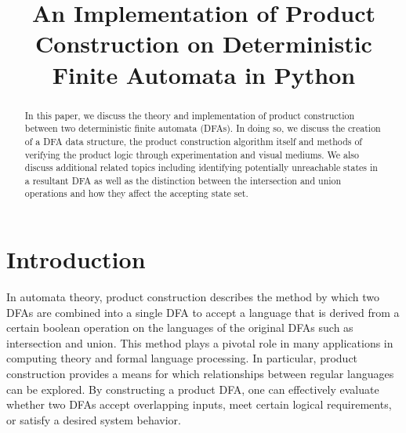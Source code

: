 \documentclass[conference]{IEEEtran}
\begin{document}
\title{An Implementation of Product Construction on Deterministic Finite Automata in Python}

\author{
\and
{}
\and
{}
}

\maketitle

\begin{abstract}
In this paper, we discuss the theory and implementation of product construction between two deterministic finite automata (DFAs). In doing so, we discuss the creation of a DFA data structure, the product construction algorithm itself and methods of verifying the product logic through experimentation and visual mediums. We also discuss additional related topics including identifying potentially unreachable states in a resultant DFA as well as the distinction between the intersection and union operations and how they affect the accepting state set.
\end{abstract}

\section{Introduction}
In automata theory, product construction describes the method by which two DFAs are combined into a single DFA to accept a language that is derived from a certain boolean operation on the languages of the original DFAs such as intersection and union. This method plays a pivotal role in many applications in computing theory and formal language processing. In particular, product construction provides a means for which relationships between regular languages can be explored. By constructing a product DFA, one can effectively evaluate whether two DFAs accept overlapping inputs, meet certain logical requirements, or satisfy a desired system behavior.
\end{document}
